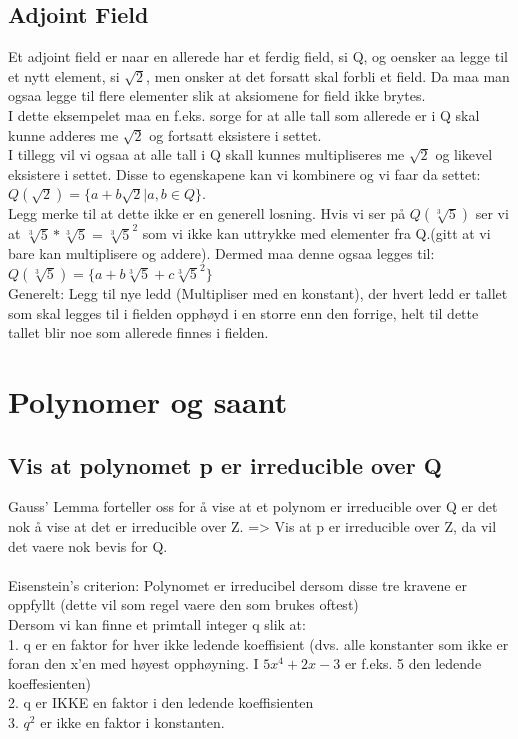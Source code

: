 \documentclass[12pt,a4paper]{article}
\begin{document}
\subsection*{Adjoint Field}
Et adjoint field er naar en allerede har et ferdig field, si Q, og oensker aa legge til et nytt element, si $\sqrt{2}$, men onsker at det forsatt skal forbli et field. Da maa man ogsaa legge til flere elementer slik at aksiomene for field ikke brytes.\\
I dette eksempelet maa en f.eks. sorge for at alle tall som allerede er i Q skal kunne adderes me $\sqrt{2}$ og fortsatt eksistere i settet.\\
I tillegg vil vi ogsaa at alle tall i Q skall kunnes multipliseres me $\sqrt{2}$ og likevel eksistere i settet. Disse to egenskapene kan vi kombinere og vi faar da settet:\\
$Q(\sqrt{2}) = \{a + b\sqrt{2} | a,b \in Q\}$.\\
Legg merke til at dette ikke er en generell losning. Hvis vi ser på $Q(\sqrt[3]{5})$ ser vi at $\sqrt[3]{5} * \sqrt[3]{5} = \sqrt[3]{5} ^ 2 $ som vi ikke kan uttrykke med elementer fra Q.(gitt at vi bare kan multiplisere og addere). Dermed maa denne ogsaa legges til:\\
$Q(\sqrt[3]{5}) = \{a+b\sqrt[3]{5} + c \sqrt[3]{5}^2\}$  \\
Generelt: Legg til nye ledd (Multipliser med en konstant), der hvert ledd er tallet som skal legges til i fielden opphøyd i en storre enn den forrige, helt til dette tallet blir noe som allerede finnes i fielden. 

\section*{Polynomer og saant}

\subsection*{Vis at polynomet p er irreducible over Q}
Gauss' Lemma forteller oss for å vise at et polynom er irreducible over Q er det nok å vise at det er irreducible over Z. => Vis at p er irreducible over Z, da vil det vaere nok bevis for Q.
\\\\
Eisenstein's criterion: Polynomet er irreducibel dersom disse tre kravene er oppfyllt (dette vil som regel vaere den som brukes oftest)\\
Dersom vi kan finne et primtall integer q slik at:\\
1. q er en faktor for hver ikke ledende koeffisient (dvs. alle konstanter som ikke er foran den x'en med høyest opphøyning. I $5x^4 +2x -3$ er f.eks. 5 den ledende koeffesienten)\\
2. q er IKKE en faktor i den ledende koeffisienten\\
3. $q^2$ er ikke en faktor i konstanten. \\\\
\end{document}

